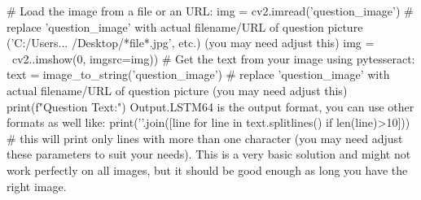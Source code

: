 # Load the image from a file or an URL:   
img = cv2.imread('question_image')     # replace 'question_image' with actual filename/URL of question picture   ('C:/Users... /Desktop/*file*.jpg', etc.)  (you may need adjust this)      img = ~cv2..imshow(0, imgsrc=img))
# Get the text from your image using pytesseract:   
text = image_to_string('question_image')   # replace 'question_image' with actual filename/URL of question picture  (you may need adjust this)      print(f"Question Text:")     Output.LSTM64 is the output format, you can use other formats as well like:   
print('\n'.join([line for line in text.splitlines() if len(line)>10]))  # this will print only lines with more than one character   (you may need adjust these parameters to suit your needs). This is a very basic solution and might not work perfectly on all images, but it should be good enough as long you have the right image.
